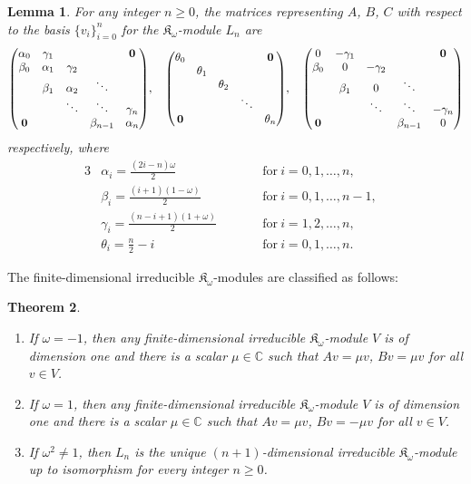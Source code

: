 \documentclass[pdftex]{sigma}%
\def\C{\mathbb C}
\def\K{\mathfrak K_\omega}
\numberwithin{equation}{section}
\newtheorem{Theorem}{Theorem}[section]
\newtheorem{Lemma}[Theorem]{Lemma}
\begin{document}
\begin{Lemma}\label{lem:Vn_K}
For any integer $n\geq 0$, the matrices representing $A$, $B$, $C$ with respect to the basis $\{v_i\}_{i=0}^n$ for the $\K$-module $L_n$ are
\begin{gather*}
\begin{pmatrix}
\alpha_0 &\gamma_1 & & &{\bf 0}
\\
\beta_0 &\alpha_1 &\gamma_2
\\
&\beta_1 &\alpha_2 &\ddots
 \\
& &\ddots &\ddots &\gamma_n
 \\
{\bf 0} & & &\beta_{n-1} &\alpha_n
\end{pmatrix}\!,
\quad
\begin{pmatrix}
\theta_0 & & & &{\bf 0}
\\
 &\theta_1
\\
 & &\theta_2
 \\
 & & &\ddots
 \\
{\bf 0} & & & &\theta_n
\end{pmatrix}\!,
\quad
\begin{pmatrix}
0 &-\gamma_1 & & &{\bf 0}
\\
\beta_0 &0 &-\gamma_2
\\
&\beta_1 &0 &\ddots
 \\
& &\ddots &\ddots &-\gamma_n
 \\
{\bf 0} & & &\beta_{n-1} &0
\end{pmatrix}
\end{gather*}
respectively, where
\begin{alignat*}{3}
&\alpha_i=\frac{(2i-n)\omega}{2}\qquad
&&\text{for}\ i=0,1,\dots,n,&
\\
&\beta_i=\frac{(i+1)(1-\omega)}{2}\qquad
&&\text{for}\ i=0,1,\dots,n-1,&
\\
&\gamma_i=\frac{(n-i+1)(1+\omega)}{2}\qquad
&&\text{for}\ i=1,2,\dots,n,&
\\
&\theta_i=\frac{n}{2}-i\qquad
&&\text{for}\ i=0,1,\dots,n.&
\end{alignat*}
\end{Lemma}

The finite-dimensional irreducible $\K$-modules are classified as follows:

{\samepage\begin{Theorem}\label{thm:classification}\quad
\begin{enumerate}\itemsep=-1pt
\item[$(i)$] If $\omega=-1$, then
any finite-dimensional irreducible $\K$-module $V$ is of dimension one and there is a scalar $\mu\in \C$ such that
$Av=\mu v$, $Bv=\mu v$
 for all $v\in V$.

\item[$(ii)$] If $\omega=1$, then any finite-dimensional irreducible $\K$-module $V$ is of dimension one and there is a scalar $\mu\in \C$ such that
$Av=\mu v$, $Bv=-\mu v$ for all $v\in V$.

\item[$(iii)$] If $\omega^2\not=1$, then $L_n$ is the unique $(n+1)$-dimensional irreducible $\K$-module up to isomorphism for every integer $n\geq 0$.
\end{enumerate}
\end{Theorem}}
\end{document}
